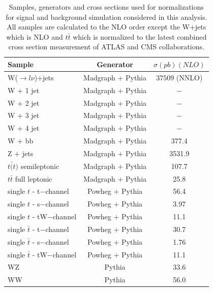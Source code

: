 \begin{table}[h]
  \centering
  \caption{Samples, generators and cross sections used for normalizations for signal and background simulation considered in this analysis. All samples are calculated to the NLO order except the W+jets which is NLO and $t\bar{t}$ which is normalized to the latest combined cross section measurement of ATLAS and CMS collaborations\cite{CMS:2014gta}. }
  \label{tab:samples}
  \begin{tabular}{ l  c c}
      \hline
      \hline
      	Sample & Generator & $\sigma(pb)(NLO)$ \\
      	\hline
    		W($\rightarrow l \nu$)+jets &  Madgraph + Pythia & $37509$ (NNLO) \\
     	W $+$ 1 jet & Madgraph $+$ Pythia & $-$ \\
     	W $+$ 2 jet & Madgraph $+$ Pythia & $-$ \\
     	W $+$ 3 jet & Madgraph $+$ Pythia & $-$ \\
     	W $+$ 4 jet & Madgraph $+$ Pythia & $-$ \\
     	W $+$ bb & Madgraph + Pythia & 377.4 \\
     	\hline
     	Z $+$ jets & Madgraph $+$ Pythia &  3531.9 \\     	
     	$t\bar(t)$ semileptonic & Madgraph $+$ Pythia &  107.7 \\
     	$t\bar{t}$ full leptonic & Madgraph $+$ Pythia &  25.8 \\
     	\hline
     	single $t$ - t$-$channel & Powheg $+$ Pythia &  56.4 \\
     	single $t$ - s$-$channel & Powheg $+$ Pythia &  3.97 \\
		single $t$ - tW$-$channel & Powheg $+$ Pythia &  11.1 \\
		single $\bar{t}$ - t$-$channel & Powheg $+$ Pythia &  30.7 \\
		single $\bar{t}$ - s$-$channel & Powheg $+$ Pythia &  1.76 \\
		single $\bar{t}$ - tW$-$channel & Powheg $+$ Pythia &  11.1 \\
		\hline
		WZ & Pythia & 33.6 \\
		WW & Pythia & 56.0 \\
      \hline
      \hline 
  \end{tabular}
\end{table}



